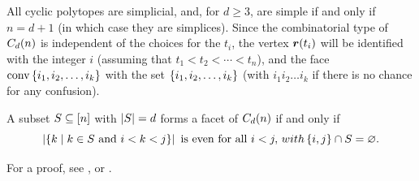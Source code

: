     All cyclic polytopes are simplicial, and, for \(d\ge3\), are simple if and only if \(n=d+1\) (in which case they are simplices).  Since the combinatorial type of \(\cyc nd\) is independent of the choices for the \(t_i\), the vertex \(\ve r(t_i)\) will be identified with the integer \(i\) (assuming that \(t_1<t_2<\dotsb<t_n\)), and the face \(\conv\seta{i_1,i_2\dc i_k}\) with the set \(\seta{i_1,i_2\dc i_k}\) (with \(i_1i_2\ldots i_k\) if there is no chance for any confusion).
    \begin{Theorem}
        A subset \(S\sbset \brac n\) with \(\card S=d\) forms a facet of \(\cyc nd\) if and only if
            \[
                \card{\setb{k}{k\in S\text{ and }i<k<j}}\text{ is even for all } i<j,\, with \seta{i,j}\cap S=\mt.
            \]
    \end{Theorem}
    For a proof, see \cite{GrunBook}, \cite{McMullenBook} or \cite{ZieglerBook}.
